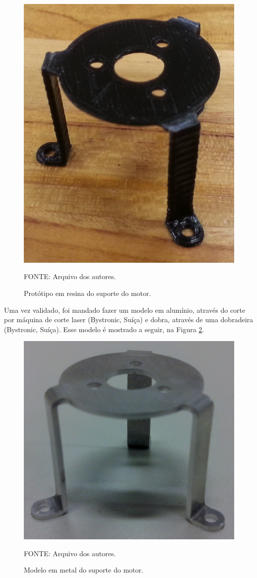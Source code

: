 \documentclass[
	12pt,				%
	openany,			%
	twoside,			%
	a4paper,			%
	english,			%
	french,				%
	spanish,			%
	brazil,				%
	oldfontcommands
	]{abntex2}
\begin{document}
\begin{figure}[th]
	\caption{Protótipo em resina do suporte do motor.}
	\centering
	\includegraphics[width=0.5\linewidth]{./figs/Proto_3D}
	
	\begin{small}
		FONTE: Arquivo dos autores.
	\end{small}
	\label{fig:ProtoMSP}
\end{figure}

\newpage

Uma vez validado, foi mandado fazer um modelo em alumínio, através do corte por máquina de corte laser (Bystronic, Suíça) e dobra, através de uma dobradeira (Bystronic, Suíça). Esse modelo é mostrado a seguir, na Figura \ref{fig:ProtoMS}.

\begin{figure}[th]
	\caption{Modelo em metal do suporte do motor.}
	\centering
	\includegraphics[width=0.5\linewidth]{./figs/Proto_MS}
	
	\begin{small}
		FONTE: Arquivo dos autores.
	\end{small}
	\label{fig:ProtoMS}
\end{figure}
\end{document}
